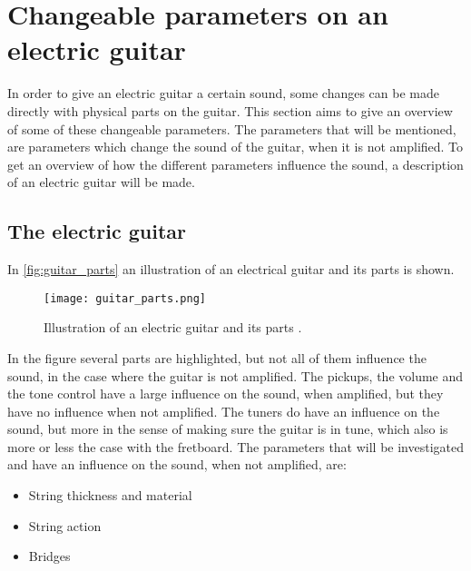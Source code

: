 \section{Changeable parameters on an electric guitar}\label{sec:electric_guitar_theory} 

In order to give an electric guitar a certain sound, some changes can be made directly with physical parts on the guitar. This section aims to give an overview of some of these changeable parameters. The parameters that will be mentioned, are parameters which change the sound of the guitar, when it is not amplified.
To get an overview of how the different parameters influence the sound, a description of an electric guitar will be made.

\subsection{The electric guitar}

In \autoref{fig:guitar_parts} an illustration of an electrical guitar and its parts is shown.

\begin{figure}[htbp!]
	\centering
		\texttt{[image: guitar\_parts.png]}
		\caption{Illustration of an electric guitar and its parts \cite{coustii}.}
		\label{fig:guitar_parts}
\end{figure}

In the figure several parts are highlighted, but not all of them influence the sound, in the case where the guitar is not amplified. The pickups, the volume and the tone control have a large influence on the sound, when amplified, but they have no influence when not amplified. The tuners do have an influence on the sound, but more in the sense of making sure the guitar is in tune, which also is more or less the case with the fretboard. 
The parameters that will be investigated and have an influence on the sound, when not amplified, are:

\begin{itemize}
 \item String thickness and material
 \item String action
 \item Bridges
\end{itemize}


